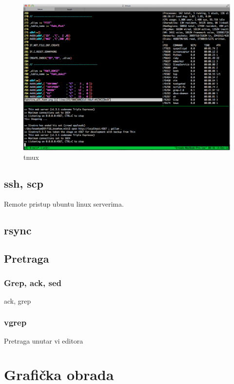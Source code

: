\documentclass[times, utf8, seminar]{fit}
\begin{document}
\begin{figure}[H]
\centering
\includegraphics[width=14cm]{img/tmux.png}
\caption{tmux}
\end{figure}


\section{ssh, scp}

Remote pristup ubuntu linux serverima.

\section{rsync}

\section{Pretraga}

\subsection{Grep, ack, sed}

ack, grep

\subsection{vgrep}

Pretraga unutar vi editora

\chapter{Grafička obrada}
\end{document}

